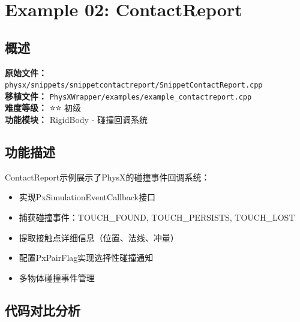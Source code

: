 \section{Example 02: ContactReport}
\label{sec:example_contactreport}

\subsection{概述}
\textbf{原始文件：} \texttt{physx/snippets/snippetcontactreport/SnippetContactReport.cpp} \\
\textbf{移植文件：} \texttt{PhysXWrapper/examples/example\_contactreport.cpp} \\
\textbf{难度等级：} ⭐⭐ 初级 \\
\textbf{功能模块：} RigidBody - 碰撞回调系统

\subsection{功能描述}
ContactReport示例展示了PhysX的碰撞事件回调系统：
\begin{itemize}
    \item 实现PxSimulationEventCallback接口
    \item 捕获碰撞事件：TOUCH\_FOUND, TOUCH\_PERSISTS, TOUCH\_LOST
    \item 提取接触点详细信息（位置、法线、冲量）
    \item 配置PxPairFlag实现选择性碰撞通知
    \item 多物体碰撞事件管理
\end{itemize}

\subsection{代码对比分析}

